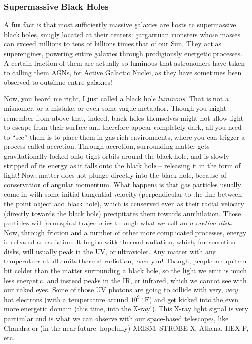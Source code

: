 \subsubsection{Supermassive Black Holes}

A fun fact is that most sufficiently massive galaxies are hosts to supermassive black holes, snugly located at their centers: gargantuan monsters whose masses can exceed millions to tens of billions times that of our Sun. They act as superengines, powering entire galaxies through prodigiously energetic processes. A certain fraction of them are actually so luminous that astronomers have taken to calling them AGNs, for Active Galactic Nuclei, as they have sometimes been observed to outshine entire galaxies!

Now, you heard me right, I just called a black hole \textit{luminous}. That is not a misnomer, or a mistake, or even some vague metaphor. Though you might remember from above that, indeed, black holes themselves might not allow light to escape from their surface and therefore appear completely dark, all you need to ``see'' them is to place them in gas-rich environments, where you can trigger a process called accretion. Through accretion, surrounding matter gets gravitationally locked onto tight orbits around the black hole, and is slowly stripped of its energy as it falls onto the black hole -- releasing it in the form of light! Now, matter does not plunge directly into the black hole, because of conservation of angular momentum. What happens is that gas particles usually come in with some initial tangential velocity (perpendicular to the line between the point object and black hole), which is conserved even as their radial velocity (directly towards the black hole) precipitates them towards annihilation. Those particles will form spiral trajectories through what we call an \textit{accretion disk}. Now, through friction and a number of other more complicated processes, energy is released as radiation. It begins with thermal radiation, which, for accretion disks, will usually peak in the UV, or ultraviolet. Any matter with any temperature at all emits thermal radiation, even you! Though, people are quite a bit colder than the matter surrounding a black hole, so the light we emit is much less energetic, and instead peaks in the IR, or infrared, which we cannot see with our naked eyes. Some of those UV photons are going to collide with very, \textit{very} hot electrons (with a temperature around $10^9$ $^\circ \mathrm{F}$) and get kicked into the even more energetic domain (this time, into the X-ray!). This X-ray light signal is very particular and is what we can observe with our space-based telescopes, like Chandra or (in the near future, hopefully) XRISM, STROBE-X, Athena, HEX-P, etc.






